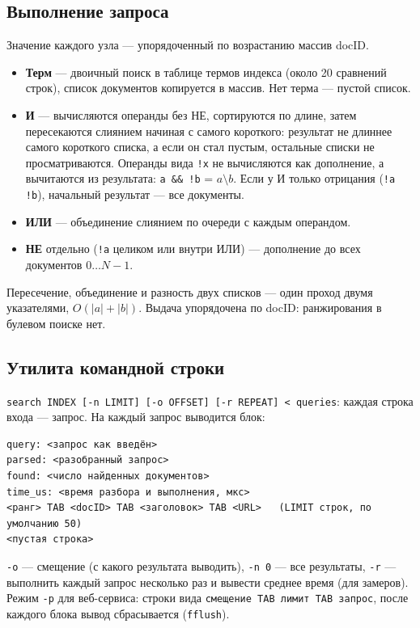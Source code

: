 \subsection{Выполнение запроса}
Значение каждого узла --- упорядоченный по возрастанию массив docID.
\begin{itemize}
    \item \textbf{Терм} --- двоичный поиск в таблице термов индекса (около 20 сравнений строк), список документов копируется в массив. Нет терма --- пустой список.
    \item \textbf{И} --- вычисляются операнды без НЕ, сортируются по длине, затем пересекаются слиянием начиная с самого короткого: результат не длиннее самого короткого списка, а если он стал пустым, остальные списки не просматриваются. Операнды вида \texttt{!x} не вычисляются как дополнение, а вычитаются из результата: \texttt{a \&\& !b} = $a \setminus b$. Если у И только отрицания (\texttt{!a !b}), начальный результат --- все документы.
    \item \textbf{ИЛИ} --- объединение слиянием по очереди с каждым операндом.
    \item \textbf{НЕ} отдельно (\texttt{!a} целиком или внутри ИЛИ) --- дополнение до всех документов $0 \ldots N-1$.
\end{itemize}
Пересечение, объединение и разность двух списков --- один проход двумя указателями, $O(|a| + |b|)$. Выдача упорядочена по docID: ранжирования в булевом поиске нет.

\subsection{Утилита командной строки}
\texttt{search INDEX [-n LIMIT] [-o OFFSET] [-r REPEAT] < queries}: каждая строка входа --- запрос. На каждый запрос выводится блок:
\begin{verbatim}
query: <запрос как введён>
parsed: <разобранный запрос>
found: <число найденных документов>
time_us: <время разбора и выполнения, мкс>
<ранг> TAB <docID> TAB <заголовок> TAB <URL>   (LIMIT строк, по умолчанию 50)
<пустая строка>
\end{verbatim}
\texttt{-o} --- смещение (с какого результата выводить), \texttt{-n 0} --- все результаты, \texttt{-r} --- выполнить каждый запрос несколько раз и вывести среднее время (для замеров). Режим \texttt{-p} для веб-сервиса: строки вида \texttt{смещение TAB лимит TAB запрос}, после каждого блока вывод сбрасывается (\texttt{fflush}).

